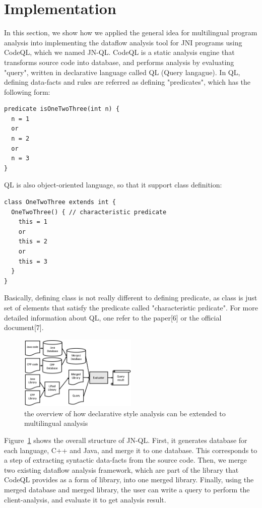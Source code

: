 \section{Implementation}
In this section, we show how we applied the general idea for multilingual
program analysis into implementing the dataflow analysis tool for JNI programs
using CodeQL, which we named JN-QL. CodeQL is a static analysis engine that
transforms source code into database, and performs analysis by evaluating
"query", written in declarative language called QL (Query langague). In QL,
defining data-facts and rules are referred as defining "predicates", which has
the following form:
\begin{lstlisting}[style=codeql,xleftmargin=2.5em]
predicate isOneTwoThree(int n) {
  n = 1
  or
  n = 2
  or
  n = 3
}
\end{lstlisting}

QL is also object-oriented language, so that it support class definition:
\begin{lstlisting}[style=codeql,xleftmargin=2.5em]
class OneTwoThree extends int {
  OneTwoThree() { // characteristic predicate
    this = 1
    or
    this = 2
    or
    this = 3
  }
}
\end{lstlisting}

Basically, defining class is not really different to defining predicate,
as class is just set of elements that satisfy the predicate called
"characteristic prdicate". For more detailed information about QL, one
refer to the paper[6] or the official document[7].

\begin{figure}[t]
  \centering
  \vspace{2mm}
  \includegraphics[width=0.5\textwidth]{img/Fig1}
  \vspace*{-1.5em}
  \caption{the overview of how declarative style analysis can be
  extended to multilingual analysis}
  \label{fig:Fig1}
\vspace*{-.5em}
\end{figure}

Figure~\ref{fig:Fig1} shows the overall structure of JN-QL. First, it generates database
for each language, C++ and Java, and merge it to one database. This corresponds to a step of
extracting syntactic data-facts from the source code. Then, we merge two
existing dataflow analysis framework, which are part of the library that 
CodeQL provides as a form of library, into one merged library. Finally, using the
merged database and merged library, the user can write a query to perform the
client-analysis, and evaluate it to get analysis result.

